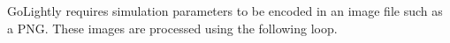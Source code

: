 \label{appendix:listings}

GoLightly requires simulation parameters to be encoded in an image file such as a PNG. These images are processed using the following loop.


